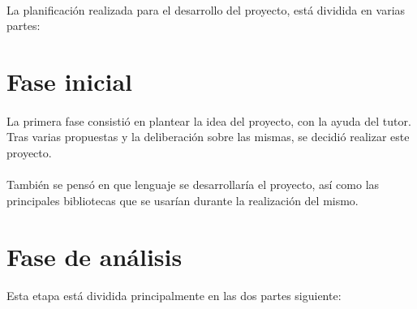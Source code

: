 \paragraph{}
La planificación realizada para el desarrollo del proyecto, está dividida en varias partes:

%    

\section{Fase inicial}

\paragraph{}
La primera fase consistió en plantear la idea del proyecto, con la ayuda del tutor. Tras varias
propuestas y la deliberación sobre las mismas, se decidió realizar este proyecto.

\paragraph{}
También se pensó en que lenguaje se desarrollaría el proyecto, así como las principales bibliotecas
que se usarían durante la realización del mismo.

\section{Fase de análisis}

\paragraph{}
Esta etapa está dividida principalmente en las dos partes siguiente:

